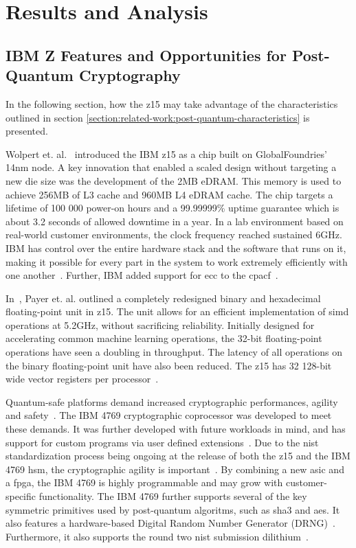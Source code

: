 \chapter{Results and Analysis}
\label{chapter:results}

\section{IBM Z Features and Opportunities for Post-Quantum Cryptography}
\label{section:results:z15}

In the following section, how the \gls{z15} may take advantage of the characteristics outlined in section \ref{section:related-work:post-quantum-characteristics} is presented.

Wolpert et. al.~\cite{wolpert2020} introduced the IBM \gls{z15} as a chip built on GlobalFoundries' 14nm node. A key innovation that enabled a scaled design without targeting a new die size was the development of the 2MB eDRAM. This memory is used to achieve 256MB of L3 cache and 960MB L4 eDRAM cache. The chip targets a lifetime of 100 000 power-on hours and a 99.99999\% uptime guarantee which is about 3.2 seconds of allowed downtime in a year. In a lab environment based on real-world customer environments, the clock frequency reached sustained 6GHz. IBM has control over the entire hardware stack and the software that runs on it, making it possible for every part in the system to work extremely efficiently with one another~\cite{wolpert2020}. Further, IBM added support for \gls{ecc} to the \gls{cpacf}~\cite{berry2020}.

In~\cite{payer2020}, Payer et. al. outlined a completely redesigned binary and hexadecimal floating-point unit in \gls{z15}. The unit allows for an efficient implementation of \gls{simd} operations at 5.2GHz, without sacrificing reliability. Initially designed for accelerating common machine learning operations, the 32-bit floating-point operations have seen a doubling in throughput. The latency of all operations on the binary floating-point unit have also been reduced. The \gls{z15} has 32 128-bit wide vector registers per processor~\cite{redbook:z15}.

Quantum-safe platforms demand increased cryptographic performances, agility and safety~\cite{busby2020}. The IBM 4769 cryptographic coprocessor was developed to meet these demands. It was further developed with future workloads in mind, and has support for custom programs via user defined extensions~\cite{busby2020, ibm:4769}. Due to the \gls{nist} standardization process being ongoing at the release of both the \gls{z15} and the IBM 4769 \gls{hsm}, the cryptographic agility is important~\cite{microsoft2020, ibm:z15:2019}. By combining a new \gls{asic} and a \gls{fpga}, the IBM 4769 is highly programmable and may grow with customer-specific functionality. The IBM 4769 further supports several of the key symmetric primitives used by \gls{post-quantum} algoritms, such as \gls{sha3} and \gls{aes}. It also features a hardware-based Digital Random Number Generator (DRNG)~\cite{ibm:4769:ep11}. Furthermore, it also supports the round two \gls{nist} submission \gls{dilithium}~\cite{ibm:4769:ep11, busby2020}.

